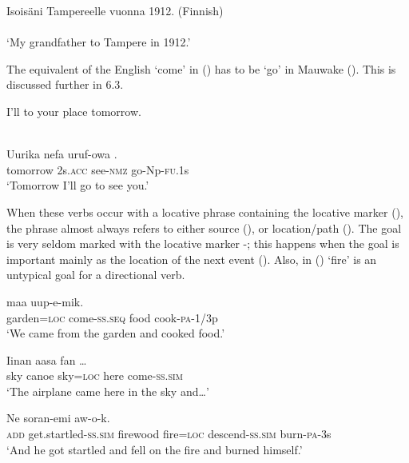 \ea%
\label{ex:x282}
\gll Isois\"ani  Tampereelle vuonna 1912. (Finnish)\\ \\
\glt`My grandfather  to Tampere in 1912.' 
\z

The equivalent of the English `come' in () has to be `go' in Mauwake (). This is discussed further in 6.3. 

\ea%
\label{ex:x283}
\gll I'll  to your place tomorrow. \\
\\
\z

\ea%
\label{ex:x284}
\gll Uurika nefa uruf-owa . \\
tomorrow 2s.\textsc{acc} see-\textsc{nmz} go-Np-\textsc{fu}.1s \\
\glt`Tomorrow I'll go to see you.'
\z

When these verbs occur with a locative phrase containing the locative marker (), the phrase almost always refers to either source (), or location/path (). The goal is very seldom marked with the locative marker -; this happens when the goal is important mainly as the location of the next event (). Also, in ()  `fire' is an untypical goal for a directional verb.

\ea%
\label{ex:x285}
\gll {}  maa uup-e-mik. \\
garden=\textsc{loc} come-\textsc{ss}.\textsc{seq} food cook-\textsc{pa}-1/3p \\
\glt`We came from the garden and cooked food.'
\z

\ea%
\label{ex:x447}
\gll Iinan aasa  fan  {\dots} \\
sky canoe sky=\textsc{loc} here come-\textsc{ss}.\textsc{sim}\\
\glt`The airplane came here in the sky and{\dots}'
\z

\ea%
\label{ex:x1878}
\gll Ne soran-emi  \textstyleEmphasizedVernacularWords{=} \textstyleEmphasizedVernacularWords{-} aw-o-k.
\\
\textsc{add} get.startled-\textsc{ss}.\textsc{sim} firewood fire=\textsc{loc} descend-\textsc{ss}.\textsc{sim} burn-\textsc{pa}-3s\\
\glt`And he got startled and fell on the fire and burned himself.'
\z

